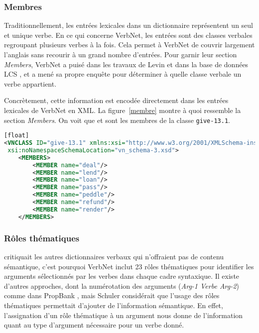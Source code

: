 \subsubsection{Membres}
Traditionnellement, les entrées lexicales dans un dictionnaire représentent un seul et unique verbe. En ce qui concerne VerbNet, les entrées sont des classes verbales regroupant  plusieurs verbes à la fois. Cela permet à VerbNet de couvrir largement l'anglais sans recourir à un grand nombre d'entrées. Pour garnir leur section \emph{Members}, VerbNet a puisé dans les travaux de Levin \cite{verb-classes.levin.1993} et dans la base de données LCS \citep{AyanGeneratingParsingLexicon2002a}, et a mené sa propre enquête pour déterminer à quelle classe verbale un verbe appartient.

Concrètement, cette information est encodée directement dans les entrées lexicales de VerbNet en XML. La figure~\ref{membre} montre à quoi ressemble la section \emph{Members}. On voit que  et  sont les membres de la classe \texttt{give-13.1}.


\begin{lstlisting}[language=XML, caption = Les membres d'une classe, label=membre][float]
<VNCLASS ID="give-13.1" xmlns:xsi="http://www.w3.org/2001/XMLSchema-instance"
 xsi:noNamespaceSchemaLocation="vn_schema-3.xsd">
    <MEMBERS>
        <MEMBER name="deal"/>
        <MEMBER name="lend"/>
        <MEMBER name="loan"/>
        <MEMBER name="pass"/>
        <MEMBER name="peddle"/>
        <MEMBER name="refund"/>
        <MEMBER name="render"/>
    </MEMBERS>
\end{lstlisting}


\subsubsection{Rôles thématiques}
\cite{SchulerVerbnetBroadcoverageComprehensive2005} critiquait les autres dictionnaires verbaux qui n'offraient pas de contenu sémantique, c'est pourquoi VerbNet inclut 23 rôles thématiques pour identifier les arguments sélectionnés par les verbes dans chaque cadre syntaxique. Il existe d'autres approches, dont la numérotation des arguments (\emph{Arg-1 Verbe Arg-2}) comme dans PropBank \citep{PalmerPropositionBankAnnotated2005}, mais Schuler considérait que l'usage des rôles thématiques permettait d'ajouter de l'information sémantique. En effet, l'assignation d'un rôle thématique à un argument nous donne de l'information quant au type d'argument nécessaire pour un verbe donné.

